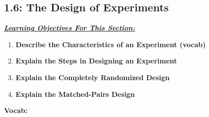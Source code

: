 \documentclass{report}
\begin{document}
        \subsection{1.6: The Design of Experiments}
        \bigbreak \noindent 
        \textbf{\textit{\underline{Learning Objectives For This Section:}}}
        \begin{enumerate}
            \item \textbf{Describe the Characteristics of an Experiment (vocab)}
            \item \textbf{Explain the Steps in Designing an Experiment}
            \item \textbf{Explain the Completely Randomized Design}
            \item \textbf{Explain the Matched-Pairs Design}
        \end{enumerate}
        \bigbreak \noindent 
        \textbf{Vocab:}
\end{document}

